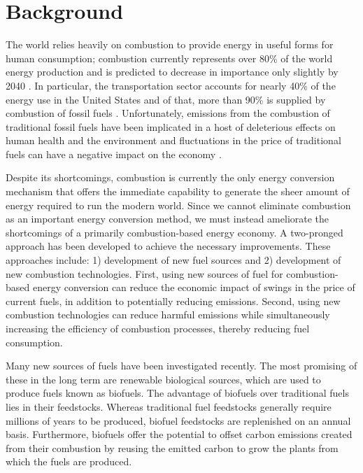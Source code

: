 \documentclass[../main.tex]{subfiles}
\begin{document}
\label{sec:intro-introduction}

\section{Background}

The world relies heavily on combustion to provide energy in useful forms for
human consumption; combustion currently represents over 80\% of the world
energy production \cite{Sims2007} and is predicted to decrease in importance
only slightly by 2040 \cite{EIA2013}. In particular, the transportation sector
accounts for nearly 40\% of the energy use in the United States and of that,
more than 90\% is supplied by combustion of fossil fuels \cite{MER2013}.
Unfortunately, emissions from the combustion of traditional fossil fuels have
been implicated in a host of deleterious effects on human health and the
environment \cite{Avakian2002} and fluctuations in the price of traditional
fuels can have a negative impact on the economy \cite{Owen2010}.

Despite its shortcomings, combustion is currently the only energy conversion
mechanism that offers the immediate capability to generate the sheer amount
of energy required to run the modern world. Since we cannot eliminate
combustion as an important energy conversion method, we must instead ameliorate
the shortcomings of a primarily combustion-based energy economy. A two-pronged
approach has been developed to achieve the necessary improvements. These approaches
include: 1) development of new fuel sources and 2) development of new
combustion technologies. First, using new sources of fuel for combustion-based
energy conversion can reduce the economic impact of swings in the price of
current fuels, in addition to potentially reducing emissions. Second, using new
combustion technologies can reduce harmful emissions while simultaneously
increasing the efficiency of combustion processes, thereby reducing fuel
consumption.

Many new sources of fuels have been investigated recently. The most promising
of these in the long term are renewable biological sources, which are used to
produce fuels known as biofuels. The advantage of biofuels over traditional
fuels lies in their feedstocks. Whereas traditional fuel feedstocks generally
require millions of years to be produced, biofuel feedstocks are replenished
on an annual basis. Furthermore, biofuels offer the potential to offset carbon
emissions created from their combustion by reusing the emitted carbon to grow
the plants from which the fuels are produced.
\end{document}
